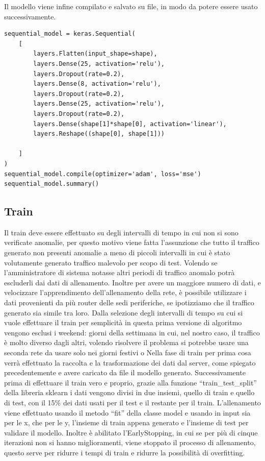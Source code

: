 Il modello viene infine compilato e salvato su file, in modo da potere essere usato successivamente.

\begin{lstlisting}[language=python3, label={code:get_data}, caption={Funzione usata per generale il modello della rete neurale}]
sequential_model = keras.Sequential(
    [
        layers.Flatten(input_shape=shape),
        layers.Dense(25, activation='relu'),
        layers.Dropout(rate=0.2),
        layers.Dense(8, activation='relu'),
        layers.Dropout(rate=0.2),
        layers.Dense(25, activation='relu'),
        layers.Dropout(rate=0.2),
        layers.Dense(shape[1]*shape[0], activation='linear'),
        layers.Reshape((shape[0], shape[1]))

    ]
)
sequential_model.compile(optimizer='adam', loss='mse')
sequential_model.summary()
\end{lstlisting}

\subsection{Train}
Il train deve essere effettuato su degli intervalli di tempo in cui non si sono verificate anomalie, per questo motivo viene fatta l'assunzione che tutto il traffico generato non presenti anomalie a meno di piccoli intervalli in cui è stato volutamente generato traffico malevolo per scopo di test. Volendo se l'amministratore di sistema notasse altri periodi di traffico anomalo potrà escluderli dai dati di allenamento.
Inoltre per avere un maggiore numero di dati, e velocizzare l'apprendimento dell'allenamento della rete, è possibile utilizzare i dati provenienti da più router delle sedi periferiche, se ipotizziamo che il traffico generato sia simile tra loro.
Dalla selezione degli intervalli di tempo su cui si vuole effettuare il train per semplicità in questa prima versione di algoritmo vengono esclusi i weekend: giorni della settimana in cui, nel nostro caso, il traffico è molto diverso dagli altri, volendo risolvere il problema si potrebbe usare una seconda rete da usare solo nei giorni festivi o %
Nella fase di train per prima cosa verrà effettuato la raccolta e la trasformazione dei dati dal server, come spiegato precedentemente e avere caricato da file il modello generato.
Successivamente prima di effettuare il train vero e proprio, grazie alla funzione ``train\_test\_split'' della libreria sklearn i dati vengono divisi in due insiemi, quello di train e quello di test, con il 15\% dei dati usati per il test e il restante per il train.
L'allenamento viene effettuato usando il metodo ``fit'' della classe model e usando in input sia per le x, che per le y, l'insieme di train appena generato e l'insieme di test per validare il modello. Inoltre è abilitato l'EarlyStopping, in cui se per più di cinque iterazioni non si hanno miglioramenti, viene stoppato il processo di allenamento, questo serve per ridurre i tempi di train e ridurre la possibilità di overfitting.

